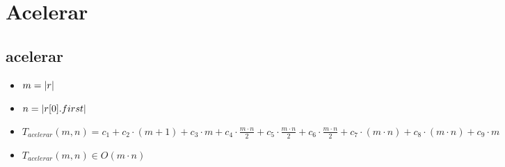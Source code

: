 \documentclass{article}
\begin{document}
    \section*{Acelerar}

    \subsection*{acelerar}

    \begin{minipage}{0.70\textwidth}
        
    \end{minipage}
    \hfill
    \begin{minipage}{0.25\textwidth}
    \end{minipage}

    \begin{itemize}
        \item $m = |r|$
        \item $n = |r[0].first|$
        \item $T_{acelerar}(m, n) = c_1 + 
                                    c_2 \cdot (m+1) +
                                    c_3 \cdot m + 
                                    c_4 \cdot \frac{m \cdot n}{2} +
                                    c_5 \cdot \frac{m \cdot n}{2} +
                                    c_6 \cdot \frac{m \cdot n}{2} +
                                    c_7 \cdot (m \cdot n) +
                                    c_8 \cdot (m \cdot n) +
                                    c_9 \cdot m $ 
        \item $T_{acelerar}(m, n) \in O(m \cdot n)$
    \end{itemize}
\end{document}
